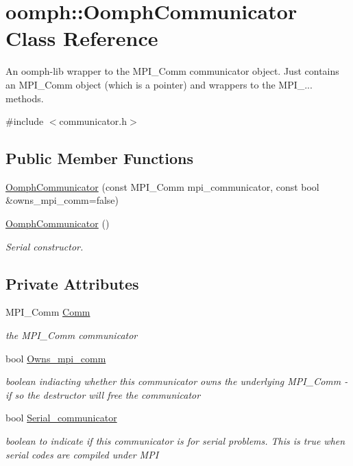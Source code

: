 \hypertarget{classoomph_1_1OomphCommunicator}{}\section{oomph\+:\+:Oomph\+Communicator Class Reference}
\label{classoomph_1_1OomphCommunicator}


An oomph-\/lib wrapper to the M\+P\+I\+\_\+\+Comm communicator object. Just contains an M\+P\+I\+\_\+\+Comm object (which is a pointer) and wrappers to the M\+P\+I\+\_\+... methods.  




{\ttfamily \#include $<$communicator.\+h$>$}

\subsection*{Public Member Functions}
\begin{DoxyCompactItemize}
\item 
\hyperlink{classoomph_1_1OomphCommunicator_af94e5be435b9cf1b01bed6242a5e46fe}{Oomph\+Communicator} (const M\+P\+I\+\_\+\+Comm mpi\+\_\+communicator, const bool \&owns\+\_\+mpi\+\_\+comm=false)
\item 
\hyperlink{classoomph_1_1OomphCommunicator_a494598d5d4b772ad78e5d588d00d2d5a}{Oomph\+Communicator} ()
\begin{DoxyCompactList}\small\item\em Serial constructor. \end{DoxyCompactList}\end{DoxyCompactItemize}
\subsection*{Private Attributes}
\begin{DoxyCompactItemize}
\item 
M\+P\+I\+\_\+\+Comm \hyperlink{classoomph_1_1OomphCommunicator_a334dbb45abab2e123872f487883f0b56}{Comm}
\begin{DoxyCompactList}\small\item\em the M\+P\+I\+\_\+\+Comm communicator \end{DoxyCompactList}\item 
bool \hyperlink{classoomph_1_1OomphCommunicator_a8c80f30933f22b84f97fcbbee6b22e81}{Owns\+\_\+mpi\+\_\+comm}
\begin{DoxyCompactList}\small\item\em boolean indiacting whether this communicator owns the underlying M\+P\+I\+\_\+\+Comm -\/ if so the destructor will free the communicator \end{DoxyCompactList}\item 
bool \hyperlink{classoomph_1_1OomphCommunicator_ab6e14f26e8effff948255e59d956d553}{Serial\+\_\+communicator}
\begin{DoxyCompactList}\small\item\em boolean to indicate if this communicator is for serial problems. This is true when serial codes are compiled under M\+PI \end{DoxyCompactList}\end{DoxyCompactItemize}


